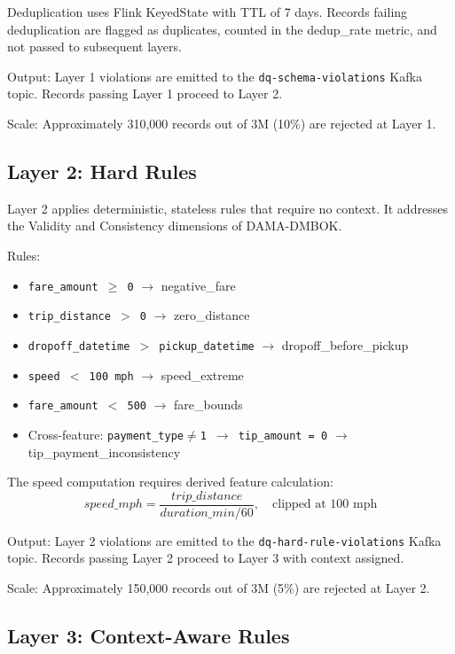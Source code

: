 Deduplication uses Flink KeyedState with TTL of 7 days. Records failing deduplication are flagged as duplicates, counted in the dedup\_rate metric, and not passed to subsequent layers.

Output: Layer 1 violations are emitted to the \texttt{dq-schema-violations} Kafka topic. Records passing Layer 1 proceed to Layer 2.

Scale: Approximately 310,000 records out of 3M (10\%) are rejected at Layer 1.

\subsection{Layer 2: Hard Rules}

Layer 2 applies deterministic, stateless rules that require no context. It addresses the Validity and Consistency dimensions of DAMA-DMBOK.

Rules:
\begin{itemize}
    \item \texttt{fare\_amount $\geq$ 0} $\to$ negative\_fare
    \item \texttt{trip\_distance $>$ 0} $\to$ zero\_distance
    \item \texttt{dropoff\_datetime $>$ pickup\_datetime} $\to$ dropoff\_before\_pickup
    \item \texttt{speed $<$ 100 mph} $\to$ speed\_extreme
    \item \texttt{fare\_amount $<$ 500} $\to$ fare\_bounds
    \item Cross-feature: \texttt{payment\_type$\neq$1 $\to$ tip\_amount = 0} $\to$ tip\_payment\_inconsistency
\end{itemize}

The speed computation requires derived feature calculation:
\begin{equation}
speed\_mph = \frac{trip\_distance}{duration\_min / 60}, \quad \text{clipped at 100 mph}
\end{equation}

Output: Layer 2 violations are emitted to the \texttt{dq-hard-rule-violations} Kafka topic. Records passing Layer 2 proceed to Layer 3 with context assigned.

Scale: Approximately 150,000 records out of 3M (5\%) are rejected at Layer 2.

\subsection{Layer 3: Context-Aware Rules}

